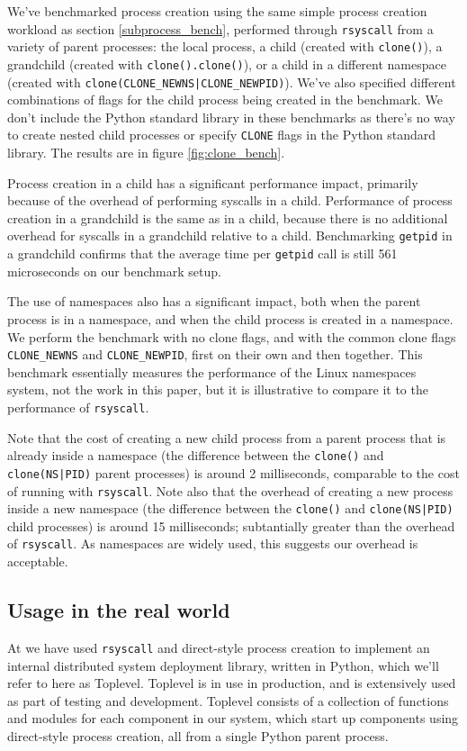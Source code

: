 \documentclass[letterpaper,twocolumn,10pt]{article}
\begin{document}
We've benchmarked process creation using the same simple process creation workload as section \ref{subprocess_bench},
performed through \texttt{rsyscall} from a variety of parent processes:
the local process,
a child (created with \texttt{clone()}),
a grandchild (created with \texttt{clone().clone()}),
or a child in a different namespace (created with \verb=clone(CLONE_NEWNS|CLONE_NEWPID)=).
We've also specified different combinations of flags for the child process being created in the benchmark.
We don't include the Python standard library in these benchmarks
as there's no way to create nested child processes or specify \texttt{CLONE} flags in the Python standard library.
The results are in figure \ref{fig:clone_bench}.

Process creation in a child has a significant performance impact,
primarily because of the overhead of performing syscalls in a child.
Performance of process creation in a grandchild is the same as in a child,
because there is no additional overhead for syscalls in a grandchild relative to a child.
Benchmarking \texttt{getpid} in a grandchild
confirms that the average time per \texttt{getpid} call is still 561 microseconds on our benchmark setup.

The use of namespaces also has a significant impact,
both when the parent process is in a namespace, and when the child process is created in a namespace.
We perform the benchmark with no clone flags, and with the common clone flags
\verb|CLONE_NEWNS| and \verb|CLONE_NEWPID|, first on their own and then together.
This benchmark essentially measures the performance of the Linux namespaces system, not the work in this paper,
but it is illustrative to compare it to the performance of \texttt{rsyscall}.

Note that the cost of creating a new child process from a parent process that is already inside a namespace
(the difference between the \texttt{clone()} and \texttt{clone(NS|PID)} parent processes)
is around 2 milliseconds, comparable to the cost of running with \texttt{rsyscall}.
Note also that the overhead of creating a new process inside a new namespace
(the difference between the \texttt{clone()} and \texttt{clone(NS|PID)} child processes)
is around 15 milliseconds; subtantially greater than the overhead of \texttt{rsyscall}.
As namespaces are widely used,
this suggests our overhead is acceptable.
\subsection{Usage in the real world}\label{realworld}
At \twosigma{} we have used \texttt{rsyscall} and direct-style process creation
to implement an internal distributed system deployment library, written in Python,
which we'll refer to here as Toplevel.
Toplevel is in use in production,
and is extensively used as part of testing and development.
Toplevel consists of a collection of functions and modules
for each component in our system,
which start up components using direct-style process creation,
all from a single Python parent process.
\end{document}
